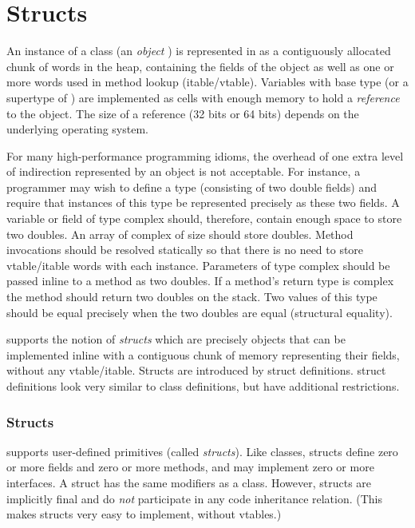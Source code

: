 \chapter{Structs}
\label{XtenStructs}
\label{StructClasses}
\label{Structs}

An instance of a class  (an \emph{object} ) is represented in \Xten{} as
a contiguously allocated chunk of words in the heap, containing the
fields of the object as well as one or more words used in method
lookup (itable/vtable). Variables with base type  (or a supertype of
) are implemented as cells with enough memory to hold a
\emph{reference} to the object. The size of a reference (32 bits or 64
bits) depends on the underlying operating system.


For many high-performance programming idioms, the overhead of one
extra level of indirection represented by an object is not
acceptable. For instance, a programmer may wish to define a type
 (consisting of two double fields) and require that instances
of this type be represented precisely as these two fields. A variable
or field of type complex should, therefore, contain enough space to
store two doubles. An array of complex of size  should store 
doubles. Method invocations should be resolved statically so that
there is no need to store vtable/itable words with each
instance. Parameters of type complex should be passed inline to a
method as two doubles. If a method's return type is complex the method
should return two doubles on the stack. Two values of this type should
be equal precisely when the two doubles are equal (structural
equality).


\Xten{} supports the notion of \emph{structs} which are precisely
objects that can be implemented inline with a contiguous chunk of
memory representing their fields, without any vtable/itable. Structs
are introduced by struct definitions. struct definitions look very
similar to class definitions, but have additional restrictions.

\subsection{Structs}

\Xten{} supports user-defined primitives (called
\emph{structs}). Like classes, structs define zero or more fields and
zero or more methods, and may implement zero or more interfaces. A
struct has the same modifiers as a class. However, structs are
implicitly final and do \emph{not} participate in any code
inheritance relation. (This makes structs very easy to implement,
without vtables.)

